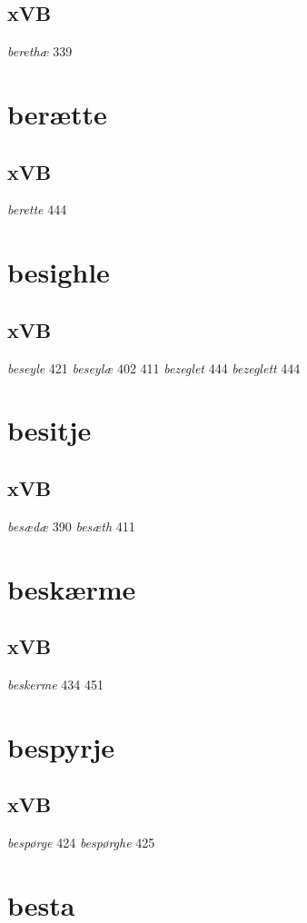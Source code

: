 \documentclass[a4paper,twocolumn]{article}
\begin{document}
\subsection{xVB}
\label{sec:org07c0160}
\emph{berethæ} 339 
\section{berætte}
\label{sec:org62fc66b}
\subsection{xVB}
\label{sec:orgca23203}
\emph{berette} 444 
\section{besighle}
\label{sec:org1d505f5}
\subsection{xVB}
\label{sec:org22a146a}
\emph{beseyle} 421 \emph{beseylæ} 402 411 \emph{bezeglet} 444 \emph{bezeglett} 444 
\section{besitje}
\label{sec:orgbe50190}
\subsection{xVB}
\label{sec:org2be41eb}
\emph{besædæ} 390 \emph{besæth} 411 
\section{beskærme}
\label{sec:org1f6c875}
\subsection{xVB}
\label{sec:org85985bb}
\emph{beskerme} 434 451 
\section{bespyrje}
\label{sec:org6bb698d}
\subsection{xVB}
\label{sec:org9bd9bf6}
\emph{bespørge} 424 \emph{bespørghe} 425 
\section{besta}
\label{sec:org29f9b1b}
\end{document}
